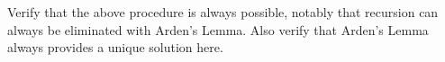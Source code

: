 Verify that the above procedure is always possible, notably that recursion can always be eliminated with Arden's
Lemma. Also verify that Arden's Lemma always provides a unique solution here.

%  
%  
%  
%  
%  
%  
%  
%  
%  
